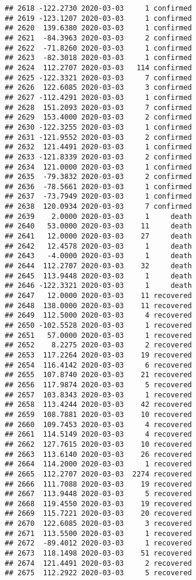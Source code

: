 \documentclass[
]{article}
\begin{document}
\begin{verbatim}
## 2618 -122.2730 2020-03-03     1 confirmed
## 2619 -123.1207 2020-03-03     1 confirmed
## 2620  139.6380 2020-03-03     1 confirmed
## 2621  -84.3963 2020-03-03     2 confirmed
## 2622  -71.8260 2020-03-03     1 confirmed
## 2623  -82.3018 2020-03-03     1 confirmed
## 2624  112.2707 2020-03-03   114 confirmed
## 2625 -122.3321 2020-03-03     7 confirmed
## 2626  122.6085 2020-03-03     3 confirmed
## 2627 -112.4291 2020-03-03     1 confirmed
## 2628  151.2093 2020-03-03     7 confirmed
## 2629  153.4000 2020-03-03     2 confirmed
## 2630 -122.3255 2020-03-03     1 confirmed
## 2631 -121.9552 2020-03-03     2 confirmed
## 2632  121.4491 2020-03-03     1 confirmed
## 2633 -121.8339 2020-03-03     2 confirmed
## 2634  121.0000 2020-03-03     1 confirmed
## 2635  -79.3832 2020-03-03     2 confirmed
## 2636  -78.5661 2020-03-03     1 confirmed
## 2637  -73.7949 2020-03-03     1 confirmed
## 2638  120.0934 2020-03-03     7 confirmed
## 2639    2.0000 2020-03-03     1     death
## 2640   53.0000 2020-03-03    11     death
## 2641   12.0000 2020-03-03    27     death
## 2642   12.4578 2020-03-03     1     death
## 2643   -4.0000 2020-03-03     1     death
## 2644  112.2707 2020-03-03    32     death
## 2645  113.9448 2020-03-03     1     death
## 2646 -122.3321 2020-03-03     1     death
## 2647   12.0000 2020-03-03    11 recovered
## 2648  138.0000 2020-03-03    11 recovered
## 2649  112.5000 2020-03-03     4 recovered
## 2650 -102.5528 2020-03-03     1 recovered
## 2651   57.0000 2020-03-03     1 recovered
## 2652    8.2275 2020-03-03     2 recovered
## 2653  117.2264 2020-03-03    19 recovered
## 2654  116.4142 2020-03-03     6 recovered
## 2655  107.8740 2020-03-03    21 recovered
## 2656  117.9874 2020-03-03     5 recovered
## 2657  103.8343 2020-03-03     1 recovered
## 2658  113.4244 2020-03-03    42 recovered
## 2659  108.7881 2020-03-03    10 recovered
## 2660  109.7453 2020-03-03     4 recovered
## 2661  114.5149 2020-03-03     4 recovered
## 2662  127.7615 2020-03-03    10 recovered
## 2663  113.6140 2020-03-03    26 recovered
## 2664  114.2000 2020-03-03     1 recovered
## 2665  112.2707 2020-03-03  2274 recovered
## 2666  111.7088 2020-03-03    19 recovered
## 2667  113.9448 2020-03-03     5 recovered
## 2668  119.4550 2020-03-03    19 recovered
## 2669  115.7221 2020-03-03    20 recovered
## 2670  122.6085 2020-03-03     3 recovered
## 2671  113.5500 2020-03-03     1 recovered
## 2672  -89.4012 2020-03-03     1 recovered
## 2673  118.1498 2020-03-03    51 recovered
## 2674  121.4491 2020-03-03     2 recovered
## 2675  112.2922 2020-03-03     5 recovered

\end{verbatim}
\end{document}
